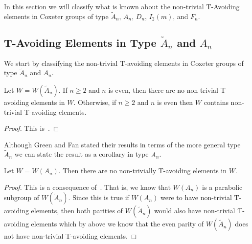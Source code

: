 In this section we will classify what is known about the non-trivial T-Avoiding elements in Coxeter groups of type $\widetilde{A}_n$, $A_n$, $D_n$, $I_2(m)$, and $F_n$.


\subsection{T-Avoiding Elements in Type $\widetilde{A}_n$ and $A_n$}
We start by classifying the non-trivial T-avoiding elements in Coxeter groups of type $\widetilde{A}_n$ and $A_n$. 
\begin{theorem}
Let $W=W(\widetilde{A}_n)$.  If $n \geq 2$ and $n$ is even, then there are no non-trivial T-avoiding elements in $W$. Otherwise, if $n \geq 2$ and $n$ is even then $W$ contains non-trivial T-avoiding elements.
\begin{proof}
	This is~\cite[Proposition~3.1.2.]{Fan1999}.
\end{proof}
\end{theorem}

Although Green and Fan stated their results in terms of the more general type $\widetilde{A}_n$ we can state the result as a corollary in type $A_n$.
\begin{corollary}
Let $W=W(A_n)$. Then there are no non-trivially T-avoiding elements in $W$. 
\begin{proof}
This is a consequence of~\cite[Proposition 3.1.2.]{Fan1999}.	 That is,  we know that $W(A_n)$ is a parabolic subgroup of $W(\widetilde{A}_n)$. Since this is true if $W(A_n)$ were to have non-trivial T-avoiding elements, then both parities of $W(\widetilde{A}_n)$ would also have non-trivial T-avoiding elements which by above we know that the even parity of $W(\widetilde{A}_n)$ does not have non-trivial T-avoiding elements.
\end{proof}
\end{corollary}

